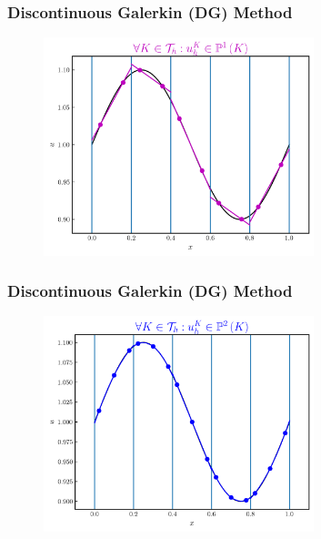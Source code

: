 \documentclass{beamer}
\begin{document}
\begin{frame}
\frametitle{Discontinuous Galerkin (DG) Method}

  \begin{figure}[htb!]
    \centering
    \includegraphics[width=0.7\textwidth]{fig.sine_k1.png}
  \end{figure}

\end{frame}

\begin{frame}
\frametitle{Discontinuous Galerkin (DG) Method}

  \begin{figure}[htb!]
    \centering
    \includegraphics[width=0.7\textwidth]{fig.sine_k2.png}
  \end{figure}

\end{frame}
\end{document}
